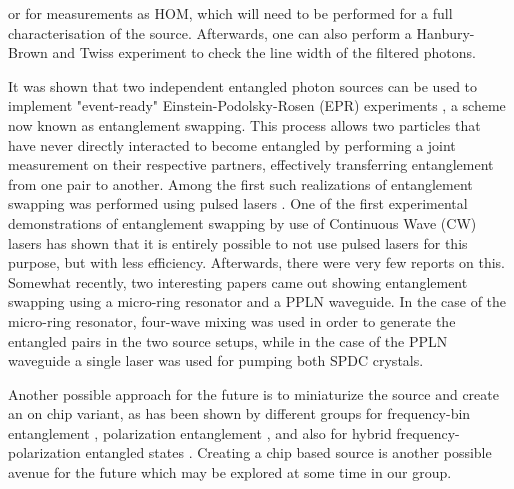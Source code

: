 \documentclass{article}
\theoremstyle{mytheoremstyle}
\theoremstyle{mytheoremstyle}
\theoremstyle{myproblemstyle}
\begin{document}
or for measurements as HOM, which will need to be performed for a full characterisation of the source.
Afterwards, one can also perform a Hanbury-Brown and Twiss \cite{Brown_Twiss_1954} experiment to check the line width of the filtered photons.
\par It was shown \cite{Zukowski_1993} that two independent entangled photon sources can be used to implement
"event-ready" Einstein-Podolsky-Rosen (EPR) experiments \cite{EPR1935}, a scheme now known as entanglement swapping.
This process allows two particles that have never directly interacted to become entangled by performing a
joint measurement on their respective partners, effectively transferring entanglement from one pair to another.
Among the first such realizations of entanglement swapping was performed using pulsed lasers \cite{Kaltenbaek_2006}.
One of the first \cite{Halder_Beveratos_Jorel_Zbinden_Simon_Scarani_Gisin_2007} experimental demonstrations of entanglement
swapping by use of Continuous Wave (CW) lasers has shown that it is entirely possible to not use pulsed lasers for this purpose, but with less efficiency.
Afterwards, there were very few reports
on this. Somewhat recently, two \cite{Samara_Maring_Martin_Raja_Kippenberg_Zbinden_Thew_2021,Tsujimoto_Tanaka_Iwasaki_Ikuta_Miki_Yamashita_Terai_Yamamoto_Koashi_Imoto_2018}
interesting papers came out showing entanglement swapping using a micro-ring resonator and a PPLN waveguide. In the case of the micro-ring resonator, four-wave mixing
was used in order to generate the entangled pairs in the two source setups, while in the case of the PPLN waveguide a single laser was used for pumping both SPDC crystals.

\par Another possible approach for the future is to miniaturize the source and create
an on chip variant, as has been shown by different groups for frequency-bin entanglement \cite{S_G_S_C_F_B_L_G_B_2022},
polarization entanglement \cite{L_Z_F_F_L_L_W_R_D_X_etal._2017}, and also for hybrid frequency-polarization
entangled states \cite{F_R_D_F_L_M_A_B_D_2023}.
Creating a chip based source is another possible avenue for the future which may be explored at some time in our group.
\end{document}
